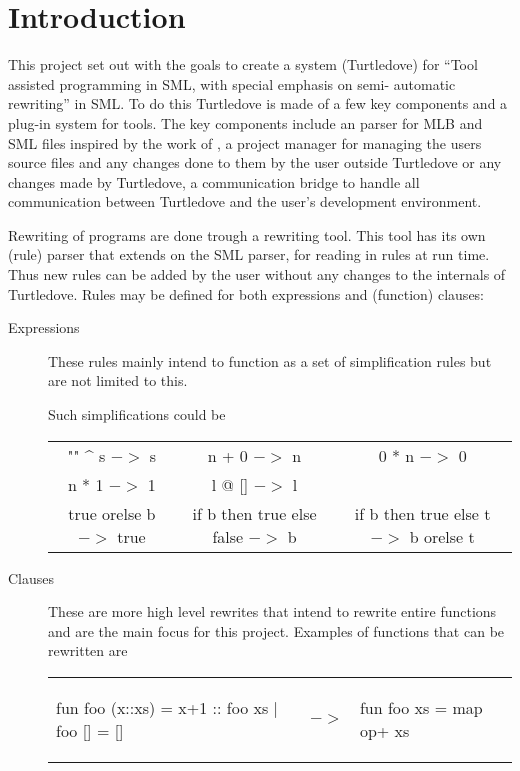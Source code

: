 \chapter{Introduction}

This project set out with the goals to create a system (Turtledove) for ``Tool
assisted programming in SML, with special emphasis on semi- automatic
rewriting'' in SML. To do this Turtledove is made of a few key components and a
plug-in system for tools. The key components include an parser for MLB and
SML files inspired by the work of \cite{mbp08}, a project manager for managing
the users source files and any changes done to them by the user outside
Turtledove or any changes made by Turtledove, a communication bridge to handle
all communication between Turtledove and the user's development environment.

Rewriting of programs are done trough a rewriting tool. This tool has its own
(rule) parser that extends on the SML parser, for reading in rules at run
time. Thus new rules can be added by the user without any changes to the
internals of Turtledove. Rules may be defined for both expressions and
(function) clauses:

\begin{description}
\item[Expressions] These rules mainly intend to function as a set of
  simplification rules but are not limited to this. 

  Such simplifications could be 

  \begin{center}    
  \begin{tabular}{ccc}
    "" \^{} s $->$ s
    & n + 0 $->$ n
    & 0 * n $->$ 0
    \\
    n * 1 $->$ 1
    &l @ [] $->$ l
    &\\
    true orelse b $->$ true
    &if b then true else false $->$ b
    &if b then true else t $->$ b orelse t    
  \end{tabular}
  \end{center}

\item[Clauses] These are more high level rewrites that intend to rewrite entire
  functions and are the main focus for this project. Examples of functions that
  can be rewritten are 

\begin{minipage}{1.0\linewidth}
  \begin{tabular}{lcl}
\begin{sml}
fun foo (x::xs) = x+1 :: foo xs
  | foo []      = []     
\end{sml}
  & $->$ &
\begin{sml}
fun foo xs = map op+ xs      
\end{sml}
  \end{tabular}
\end{minipage}
\end{description}

